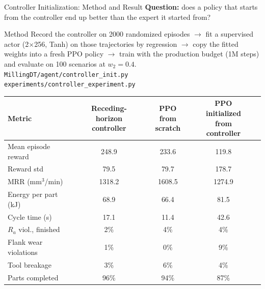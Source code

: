 ﻿\documentclass[11pt,aspectratio=169]{beamer}
\newcommand{\MRR}{\mathrm{MRR}}
\newcommand{\Ra}{R_a}
\begin{document}
\begin{frame}{Controller Initialization: Method and Result}
    \small
    \footnotesize\textbf{Question:} does a policy that starts from the controller end up better than the expert it started from?

    \begin{block}{Method}
    \scriptsize
    Record the controller on 2000 randomized episodes $\to$ fit a supervised actor (2$\times$256,
    Tanh) on those trajectories by regression $\to$ copy the fitted weights into a fresh PPO policy
    $\to$ train with the production budget (1M steps) and evaluate on 100 scenarios at $w_2 = 0.4$.
    \texttt{MillingDT/agent/controller\_init.py} \quad \texttt{experiments/controller\_experiment.py}
    \end{block}

    \centering
    \scriptsize
    \begin{tabular}{@{}lcccc@{}}
    \toprule
    \textbf{Metric} & \makecell{\textbf{Receding-horizon}\\\textbf{controller}} & \makecell{\textbf{PPO}\\\textbf{from scratch}} & \makecell{\textbf{PPO initialized}\\\textbf{from controller}} \\
    \midrule
    Mean episode reward & \alert{248.9} & 233.6 & 119.8 \\
    Reward std & 79.5 & 79.7 & \alert{178.7} \\
    $\MRR$ (mm$^3$/min) & 1318.2 & \alert{1608.5} & 1274.9 \\
    Energy per part (kJ) & 68.9 & 66.4 & 81.5 \\
    Cycle time (s) & 17.1 & \alert{11.4} & 42.6 \\
    $\Ra$ viol., finished & 2\% & 4\% & 4\% \\
    Flank wear violations & 1\% & \alert{0\%} & 9\% \\
    Tool breakage & 3\% & 6\% & 4\% \\
    Parts completed & 96\% & 94\% & 87\% \\
    \bottomrule
    \end{tabular}
\end{frame}
\end{document}
